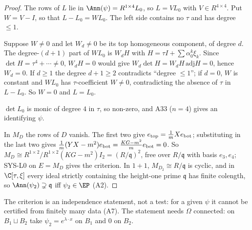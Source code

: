 \begin{proof}
The rows of $L$ lie in $\Ann(\psi)=R^{1\times4}L_0$, so $L=VL_0$ with $V\in R^{4\times4}$. Put $W=V-I$, so that $L-L_0=WL_0$. The left side contains no $\tau$ and has degree $\le1$.

Suppose $W\ne0$ and let $W_d\ne0$ be its top homogeneous component, of degree $d$. The degree-$(d+1)$ part of $WL_0$ is $W_dH$ with $H=\tau I+\sum\alpha^k_0\xi_k$. Since $\det H=\tau^4+\cdots\ne0$, $W_dH=0$ would give $W_d\det H=W_dH\,\mathrm{adj}H=0$, hence $W_d=0$. If $d\ge1$ the degree $d+1\ge2$ contradicts ``degree $\le1$''; if $d=0$, $W$ is constant and $WL_0$ has $\tau$-coefficient $W\ne0$, contradicting the absence of $\tau$ in $L-L_0$. So $W=0$ and $L=L_0$.

$\det L_0$ is monic of degree $4$ in $\tau$, so non-zero, and A33 ($n=4$) gives an identifying $\psi$.

In $M_D$ the rows of $D$ vanish. The first two give $e_{\rm top}=\tfrac1mXe_{\rm bot}$; substituting in the last two gives $\tfrac1m(YX-m^2)e_{\rm bot}=\tfrac{KG-m^2}{m}e_{\rm bot}=0$. So $M_D\cong R^{1\times2}/R^{1\times2}(KG-m^2)I_2=(R/\mathfrak q)^2$, free over $R/\mathfrak q$ with basis $e_3,e_4$; SYS-L0 on $E=M_D$ gives the criterion. In $1+1$, $M_{D_2}\cong R/\mathfrak q$ is cyclic, and in $\C[\tau,\xi]$ every ideal strictly containing the height-one prime $\mathfrak q$ has finite colength, so $\Ann(\psi_2)\supsetneq\mathfrak q$ iff $\psi_2\in\EP$ (A2).

\end{proof}

\begin{caution}[title=Scope]
The criterion is an independence statement, not a test: for a given $\psi$ it cannot be certified from finitely many data (A7). The statement needs $\Omega$ connected: on $B_1\sqcup B_2$ take $\psi_2=e^{\lambda\cdot x}$ on $B_1$ and $0$ on $B_2$.
\end{caution}
